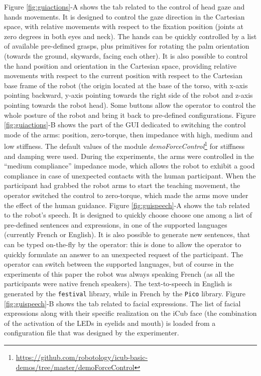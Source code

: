 Figure \ref{fig:guiactions}-A shows the tab related to the control of head gaze and hands movements. It is designed to control the gaze direction in the Cartesian space, with relative movements with respect to the fixation position (joints at zero degrees in both eyes and neck). The hands can be quickly controlled by a list of available pre-defined grasps, plus primitives for rotating the palm orientation (towards the ground, skywards, facing each other). It is also possible to control the hand position and orientation in the Cartesian space, providing relative movements with respect to the current position with respect to the Cartesian base frame of the robot (the origin located at the base of the torso, with x-axis pointing backward, y-axis pointing towards the right side of the robot and z-axis pointing towards the robot head). Some buttons allow the operator to control the whole posture of the robot and bring it back to pre-defined configurations. 
Figure \ref{fig:guiactions}-B shows the part of the GUI dedicated to switching the control mode of the arms: position, zero-torque, then impedance with high, medium and low stiffness. The default values of the module \textit{demoForceControl}\footnote{\url{https://github.com/robotology/icub-basic-demos/tree/master/demoForceControl}} for stiffness and damping were used. During the experiments, the arms were controlled in the ``medium compliance'' impedance mode, which allows the robot to exhibit a good compliance in case of unexpected contacts with the human participant. When the participant had grabbed the robot arms to start the teaching movement, the operator switched the control to zero-torque, which made the arms move under the effect of the human guidance. 
Figure \ref{fig:guispeech}-A shows the tab related to the robot's speech. It is designed to quickly choose choose one among a list of pre-defined sentences and expressions, in one of the supported languages (currently French or English). It is also possible to generate new sentences, that can be typed on-the-fly by the operator: this is done to allow the operator to quickly formulate an answer to an unexpected request of the participant. The operator can switch between the supported languages, but of course in the experiments of this paper the robot was always speaking French (as all the participants were native french speakers). The text-to-speech in English is generated by the \texttt{festival} library, while in French by the \texttt{Pico} library. 
Figure \ref{fig:guispeech}-B shows the tab related to facial expressions. The list of facial expressions along with their specific realization on the iCub face (the combination of the activation of the LEDs in eyelids and mouth) is loaded from a configuration file that was designed by the experimenter. 

